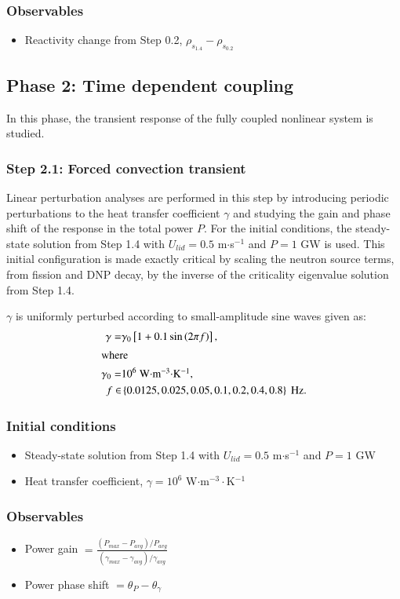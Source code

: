 \subsubsection*{Observables}
\begin{itemize}
    \item Reactivity change from Step 0.2, $\rho_{s_{1.4}} - \rho_{s_{0.2}}$
\end{itemize}

\subsection{Phase 2: Time dependent coupling}

In this phase, the transient response of the fully coupled nonlinear system is
studied.

\subsubsection{Step 2.1: Forced convection transient}

Linear perturbation analyses are performed in this step by introducing periodic
perturbations to the heat transfer coefficient $\gamma$ and studying the gain
and phase shift of the response in the total power $P$. For the initial
conditions, the steady-state solution from Step 1.4 with
$U_{lid} = 0.5$ m$\cdot$s$^{-1}$ and $P = 1$ GW is used. This initial
configuration is made exactly critical by scaling the neutron source terms,
from fission and \gls{DNP} decay, by the inverse of the criticality eigenvalue
solution from Step 1.4.

$\gamma$ is uniformly perturbed according to small-amplitude sine waves given
as:
\begin{align}
    \gamma =& \gamma_0 \left[ 1 + 0.1\sin\left(2 \pi f \right) \right], \\
    \intertext{where}
    \gamma_0 =& 10^6 \mbox{ W$\cdot$m$^{-3}\cdot$K$^{-1}$}, \nonumber \\
    f \in& \left\lbrace 0.0125, 0.025, 0.05, 0.1, 0.2, 0.4, 0.8 \right\rbrace 
    \mbox{ Hz.} \nonumber
\end{align}

\subsubsection*{Initial conditions}
\begin{itemize}
    \item Steady-state solution from Step 1.4 with
    $U_{lid} = 0.5$ m$\cdot$s$^{-1}$ and $P = 1$ GW
    \item Heat transfer coefficient, $\gamma = 10^6$ W$\cdot$m$^{-3}\cdot$K$^{-1}$
\end{itemize}
%
\subsubsection*{Observables}
\begin{itemize}
    \item Power gain $= \frac{\left(P_{max} - P_{avg}\right)/P_{avg}}{
    \left(\gamma_{max} - \gamma_{avg}\right)/\gamma_{avg}}$
    \item Power phase shift $=\theta_P - \theta_\gamma$
\end{itemize}

\FloatBarrier

